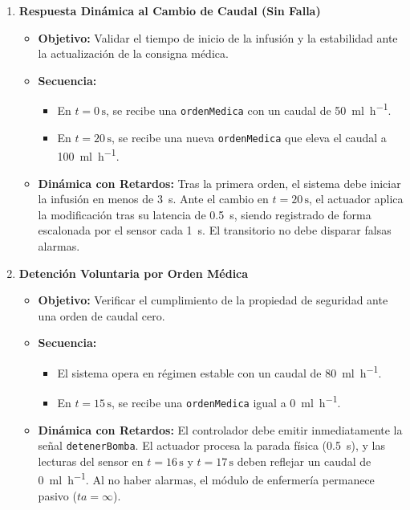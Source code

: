 \documentclass[11pt,a4paper]{article}
\begin{document}
\begin{enumerate}[label=\textbf{Escenario \arabic*:}, leftmargin=*]
    \item \textbf{Respuesta Dinámica al Cambio de Caudal (Sin Falla)}
    \begin{itemize}
        \item \textbf{Objetivo:} Validar el tiempo de inicio de la infusión y la estabilidad ante la actualización de la consigna médica.
        \item \textbf{Secuencia:} 
        \begin{itemize}
            \item En $t = 0\,\text{s}$, se recibe una \texttt{ordenMedica} con un caudal de \SI{50}{\ml\per\hour}.
            \item En $t = 20\,\text{s}$, se recibe una nueva \texttt{ordenMedica} que eleva el caudal a \SI{100}{\ml\per\hour}.
        \end{itemize}
        \item \textbf{Dinámica con Retardos:} Tras la primera orden, el sistema debe iniciar la infusión en menos de \SI{3}{\second}. Ante el cambio en $t = 20\,\text{s}$, el actuador aplica la modificación tras su latencia de \SI{0.5}{\second}, siendo registrado de forma escalonada por el sensor cada \SI{1}{\second}. El transitorio no debe disparar falsas alarmas.
    \end{itemize}

    \item \textbf{Detención Voluntaria por Orden Médica}
    \begin{itemize}
        \item \textbf{Objetivo:} Verificar el cumplimiento de la propiedad de seguridad ante una orden de caudal cero.
        \item \textbf{Secuencia:}
        \begin{itemize}
            \item El sistema opera en régimen estable con un caudal de \SI{80}{\ml\per\hour}.
            \item En $t = 15\,\text{s}$, se recibe una \texttt{ordenMedica} igual a \SI{0}{\ml\per\hour}.
        \end{itemize}
        \item \textbf{Dinámica con Retardos:} El controlador debe emitir inmediatamente la señal \texttt{detenerBomba}. El actuador procesa la parada física (\SI{0.5}{\second}), y las lecturas del sensor en $t = 16\,\text{s}$ y $t = 17\,\text{s}$ deben reflejar un caudal de \SI{0}{\ml\per\hour}. Al no haber alarmas, el módulo de enfermería permanece pasivo ($ta = \infty$).
    \end{itemize}
\end{enumerate}
\end{document}
